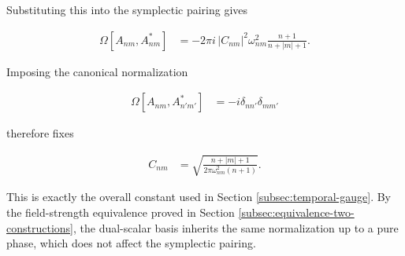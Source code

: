 Substituting this into the symplectic pairing gives

\begin{align}
\Omega[A_{nm},A_{nm}^{*}]&=-2\pi i\,|C_{nm}|^{2}\omega_{nm}^{2}\frac{n+1}{n+|m|+1}.
\end{align}

Imposing the canonical normalization

\begin{align}
\Omega[A_{nm},A_{n'm'}^{*}]&=-i\delta_{nn'}\delta_{mm'}
\end{align}

therefore fixes

\begin{align}
C_{nm}&=\sqrt{\frac{n+|m|+1}{2\pi\omega_{nm}^{2}(n+1)}}.
\end{align}

This is exactly the overall constant used in Section \ref{subsec:temporal-gauge}. By the field-strength equivalence proved in Section \ref{subsec:equivalence-two-constructions}, the dual-scalar basis inherits the same normalization up to a pure phase, which does not affect the symplectic pairing.
